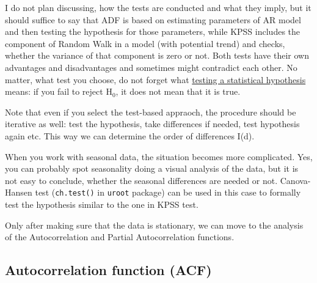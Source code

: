 \documentclass[
]{book}
\theoremstyle{definition}
\theoremstyle{definition}
\theoremstyle{definition}
\theoremstyle{definition}
\theoremstyle{remark}
\begin{document}
I do not plan discussing, how the tests are conducted and what they imply, but it should suffice to say that ADF is based on estimating parameters of AR model and then testing the hypothesis for those parameters, while KPSS includes the component of Random Walk in a model (with potential trend) and checks, whether the variance of that component is zero or not. Both tests have their own advantages and disadvantages and sometimes might contradict each other. No matter, what test you choose, do not forget what \protect\hyperlink{hypothesisTesting}{testing a statistical hypothesis} means: if you fail to reject H\(_0\), it does not mean that it is true.

Note that even if you select the test-based appraoch, the procedure should be iterative as well: test the hypothesis, take differences if needed, test hypothesis again etc. This way we can determine the order of differences I(d).

When you work with seasonal data, the situation becomes more complicated. Yes, you can probably spot seasonality doing a visual analysis of the data, but it is not easy to conclude, whether the seasonal differences are needed or not. Canova-Hansen test (\texttt{ch.test()} in \texttt{uroot} package) can be used in this case to formally test the hypothesis similar to the one in KPSS test.

Only after making sure that the data is stationary, we can move to the analysis of the Autocorrelation and Partial Autocorrelation functions.

\hypertarget{ACF}{%
\subsection{Autocorrelation function (ACF)}\label{ACF}}
\end{document}
